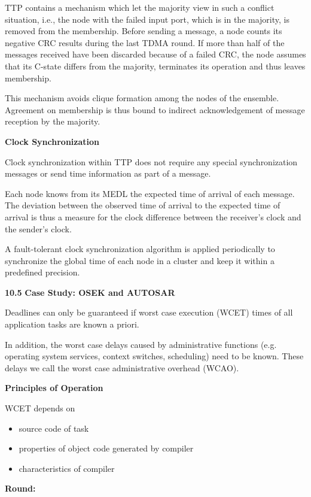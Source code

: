 TTP contains a mechanism which let the majority view in such a conflict
situation, i.e., the node with the failed input port, which is in the
majority, is removed from the membership. Before sending a message, a
node counts its negative CRC results during the last TDMA round. If more
than half of the messages received have been discarded because of a
failed CRC, the node assumes that its C-state differs from the majority,
terminates its operation and thus leaves membership.

This mechanism avoids clique formation among the nodes of the ensemble.
Agreement on membership is thus bound to indirect acknowledgement of
message reception by the majority.

\textbf{Clock Synchronization}

Clock synchronization within TTP does not require any special
synchronization messages or send time information as part of a message.

Each node knows from its MEDL the expected time of arrival of each
message. The deviation between the observed time of arrival to the
expected time of arrival is thus a measure for the clock difference
between the receiver's clock and the sender's clock.

A fault-tolerant clock synchronization algorithm is applied periodically
to synchronize the global time of each node in a cluster and keep it
within a predefined precision.

\textbf{10.5} \protect\hypertarget{teil6}{}{}\textbf{Case Study: OSEK
and AUTOSAR}

Deadlines can only be guaranteed if worst case execution (WCET) times of
all application tasks are known a priori.

In addition, the worst case delays caused by administrative functions
(e.g. operating system services, context switches, scheduling) need to
be known. These delays we call the worst case administrative overhead
(WCAO).

\textbf{Principles of Operation}

WCET depends on

\begin{itemize}
\item
  source code of task
\item
  properties of object code generated by compiler
\item
  characteristics of compiler
\end{itemize}

\textbf{Round:}

